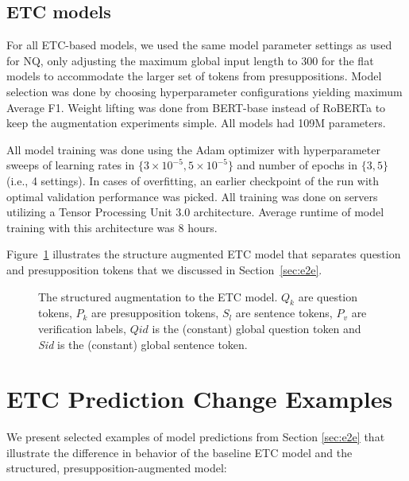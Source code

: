 \documentclass[11pt,a4paper]{article}
\begin{document}
\subsection{ETC models}
For all ETC-based models, we used the same model parameter settings as \citet{ainslie2020etc} used for NQ, only adjusting the maximum global input length to 300 for the flat models to accommodate the larger set of tokens from presuppositions. Model selection was done by choosing hyperparameter configurations yielding maximum Average F1. Weight lifting was done from BERT-base instead of RoBERTa to keep the augmentation experiments simple. All models had 109M parameters.     

All model training was done using the Adam optimizer with hyperparameter sweeps of learning rates in $\{3 \times 10^{-5}, 5 \times 10^{-5}\}$ and number of epochs in $\{3, 5\}$ (i.e., 4 settings). In cases of overfitting, an earlier checkpoint of the run with optimal validation performance was picked. All training was done on servers utilizing a Tensor Processing Unit 3.0 architecture. Average runtime of model training with this architecture was 8 hours. 

Figure~\ref{fig:etc} illustrates the structure augmented ETC model that separates question and presupposition tokens that we discussed in Section~\ref{sec:e2e}.

\begin{figure}
\caption{The structured augmentation to the ETC model. $Q_k$ are question tokens, $P_k$ are presupposition tokens, $S_l$ are sentence tokens, $P_v$ are verification labels, $Qid$ is the (constant) global question token and \textit{Sid} is the (constant) global sentence token.}
\label{fig:etc}
\end{figure}

\section{ETC Prediction Change Examples}
\label{sec:error-analysis}
We present selected examples of model predictions from Section \ref{sec:e2e} that illustrate the difference in behavior of the baseline ETC model and the structured, presupposition-augmented model:
\end{document}
